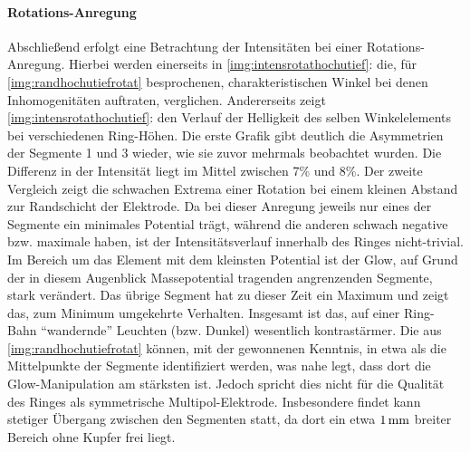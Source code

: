       \paragraph{Rotations-Anregung}

        Abschließend erfolgt eine Betrachtung der Intensitäten bei einer Rotations-Anregung. Hierbei werden einerseits in \autoref{img:intensrotathochutief}:\underline{} die, für \autoref{img:randhochutiefrotat} besprochenen, charakteristischen Winkel bei denen Inhomogenitäten auftraten, verglichen. Andererseits zeigt \autoref{img:intensrotathochutief}:\underline{} den Verlauf der Helligkeit des selben Winkelelements bei verschiedenen Ring-Höhen. Die erste Grafik gibt deutlich die Asymmetrien der Segmente 1 und 3 wieder, wie sie zuvor mehrmals beobachtet wurden. Die Differenz in der Intensität liegt im Mittel zwischen 7\% und 8\%. Der zweite Vergleich zeigt die schwachen Extrema einer Rotation bei einem kleinen Abstand zur Randschicht der Elektrode. Da bei dieser Anregung jeweils nur eines der Segmente ein minimales Potential tr\"agt, w\"ahrend die anderen schwach negative bzw. maximale haben, ist der Intensitätsverlauf innerhalb des Ringes nicht-trivial. Im Bereich um das Element mit dem kleinsten Potential ist der Glow, auf Grund der in diesem Augenblick Massepotential tragenden angrenzenden Segmente, stark verändert. Das \"ubrige Segment hat zu dieser Zeit ein Maximum und zeigt das, zum Minimum umgekehrte Verhalten. Insgesamt ist das, auf einer Ring-Bahn ``wandernde'' Leuchten (bzw. Dunkel) wesentlich kontrast\"armer. Die  aus \autoref{img:randhochutiefrotat} k\"onnen, mit der gewonnenen Kenntnis, in etwa als die Mittelpunkte der Segmente identifiziert werden, was nahe legt, dass dort die Glow-Manipulation am st\"arksten ist. Jedoch spricht dies nicht f\"ur die Qualit\"at des Ringes als symmetrische Multipol-Elektrode. Insbesondere findet kann stetiger Übergang zwischen den Segmenten statt, da dort ein etwa $\unit[1]{mm}$ breiter Bereich ohne Kupfer frei liegt.


